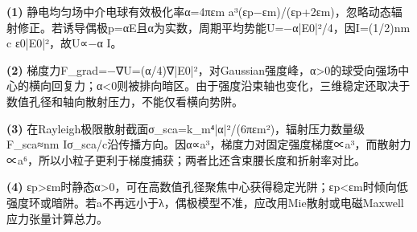 \par\noindent\textbf{(1)} 静电均匀场中介电球有效极化率α=4πεm a³(εp−εm)/(εp+2εm)，忽略动态辐射修正。若诱导偶极p=αE且α为实数，周期平均势能U=−α|E0|²/4，因I=(1/2)nm c ε0|E0|²，故U∝−α I。
\par\noindent\textbf{(2)} 梯度力F\_grad=−∇U=(α/4)∇|E0|²，对Gaussian强度峰，α>0的球受向强场中心的横向回复力；α<0则被排向暗区。由于强度沿束轴也变化，三维稳定还取决于数值孔径和轴向散射压力，不能仅看横向势阱。
\par\noindent\textbf{(3)} 在Rayleigh极限散射截面σ\_sca=k\_m⁴|α|²/(6πεm²)，辐射压力数量级F\_sca≈nm Iσ\_sca/c沿传播方向。因α∝a³，梯度力对固定强度梯度∝a³，而散射力∝a⁶，所以小粒子更利于梯度捕获；两者比还含束腰长度和折射率对比。
\par\noindent\textbf{(4)} εp>εm时静态α>0，可在高数值孔径聚焦中心获得稳定光阱；εp<εm时倾向低强度环或暗阱。若a不再远小于λ，偶极模型不准，应改用Mie散射或电磁Maxwell应力张量计算总力。

